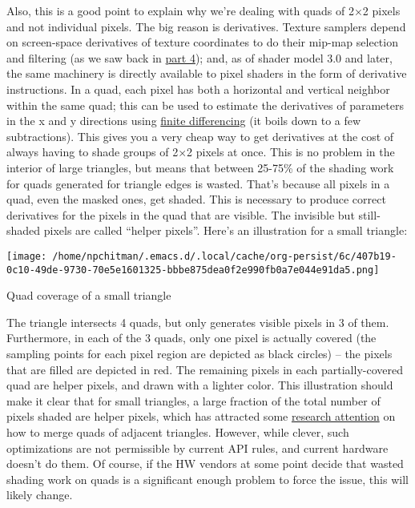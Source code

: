 \documentclass[12pt]{article}
\begin{document}
Also, this is a good point to explain why we’re dealing with quads of 2×2 pixels and not individual pixels. The big reason is derivatives. Texture samplers depend on screen-space derivatives of texture coordinates to do their mip-map selection and filtering (as we saw back in \hyperref[part4]{part 4}); and, as of shader model 3.0 and later, the same machinery is directly available to pixel shaders in the form of derivative instructions. In a quad, each pixel has both a horizontal and vertical neighbor within the same quad; this can be used to estimate the derivatives of parameters in the x and y directions using \href{http://en.wikipedia.org/wiki/Finite\_difference}{finite differencing} (it boils down to a few subtractions). This gives you a very cheap way to get derivatives at the cost of always having to shade groups of 2×2 pixels at once. This is no problem in the interior of large triangles, but means that between 25-75\% of the shading work for quads generated for triangle edges is wasted. That’s because all pixels in a quad, even the masked ones, get shaded. This is necessary to produce correct derivatives for the pixels in the quad that are visible. The invisible but still-shaded pixels are called “helper pixels”. Here’s an illustration for a small triangle:

\begin{center}
\texttt{[image: /home/npchitman/.emacs.d/.local/cache/org-persist/6c/407b19-0c10-49de-9730-70e5e1601325-bbbe875dea0f2e990fb0a7e044e91da5.png]}
\end{center}

Quad coverage of a small triangle

The triangle intersects 4 quads, but only generates visible pixels in 3 of them. Furthermore, in each of the 3 quads, only one pixel is actually covered (the sampling points for each pixel region are depicted as black circles) – the pixels that are filled are depicted in red. The remaining pixels in each partially-covered quad are helper pixels, and drawn with a lighter color. This illustration should make it clear that for small triangles, a large fraction of the total number of pixels shaded are helper pixels, which has attracted some \href{http://graphics.stanford.edu/papers/fragmerging/shade\_sig10.pdf}{research attention} on how to merge quads of adjacent triangles. However, while clever, such optimizations are not permissible by current API rules, and current hardware doesn’t do them. Of course, if the HW vendors at some point decide that wasted shading work on quads is a significant enough problem to force the issue, this will likely change.
\end{document}

